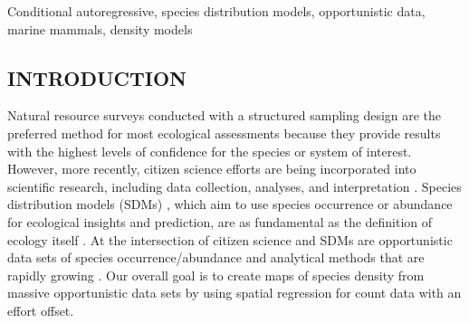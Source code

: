 \documentclass[11pt, titlepage]{article}
\begin{document}
 Conditional autoregressive, species distribution models, opportunistic data, marine mammals, density models\\




\begin{spacing}{1.9}
\begin{flushleft}
\setlength{\parindent}{1cm}
\setcounter{page}{0}


\section{INTRODUCTION}

Natural resource surveys conducted with a structured sampling design are the preferred method for most ecological assessments because they provide results with the highest levels of confidence for the species or system of interest. However, more recently, citizen science efforts are being incorporated into scientific research, including data collection, analyses, and interpretation \citep{miller-rushing_history_2012}. Species distribution models (SDMs) \citep{elith_species_2009, guisan_predicting_2013}, which aim to use species occurrence or abundance for ecological insights and prediction, are as fundamental as the definition of ecology itself \citep{Krebs1972Ecologyexperimentalanalysis}. At the intersection of citizen science and SDMs are opportunistic data sets of species occurrence/abundance \citep{soroye_opportunistic_2018} and analytical methods \citep{elith_novel_2006} that are rapidly growing \citep{renner_point_2015, lukyanenko_citizen_2020}.  Our overall goal is to create maps of species density from massive opportunistic data sets by using spatial regression for count data with an effort offset.


\end{flushleft}
\end{spacing}
\end{document}
